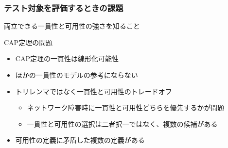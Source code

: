 \documentclass[unicode, 14pt, aspectratio=169]{beamer}
\begin{document}
\begin{frame}
  \frametitle{テスト対象を評価するときの課題}
  {\large 両立できる一貫性と可用性の強さを知ること}
  \par
  \vspace{8pt}
  CAP定理の問題
  \begin{itemize}
  \item CAP定理\cite{cap}の一貫性は線形化可能性\cite{linearizability}
  \item ほかの一貫性のモデルの参考にならない
  \item トリレンマではなく一貫性と可用性のトレードオフ\cite{cap-twelve-years-later}
    \begin{itemize}
    \item ネットワーク障害時に一貫性と可用性どちらを優先するかが問題
    \item 一貫性と可用性の選択は二者択一ではなく、複数の候補がある
    \end{itemize}
  \item 可用性の定義に矛盾した複数の定義がある\cite{kleppmann}    
  \end{itemize}
\end{frame}
\end{document}
